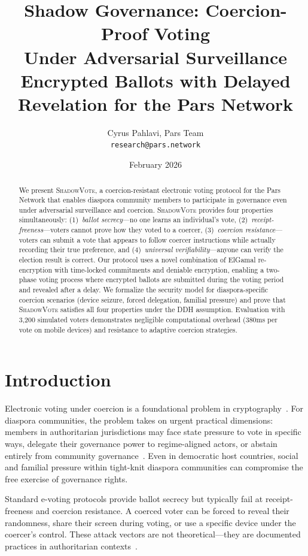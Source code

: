 \documentclass[11pt,a4paper]{article}
\title{Shadow Governance: Coercion-Proof Voting\\Under Adversarial Surveillance\\[0.5em]
\large Encrypted Ballots with Delayed Revelation for the Pars Network}
\author{
  Cyrus Pahlavi, Pars Team\\
  \texttt{research@pars.network}
}
\date{February 2026}
\newcommand{\shadow}{\textsc{ShadowVote}\xspace}
\begin{document}
\parscoverpage


\begin{abstract}
We present \shadow, a coercion-resistant electronic voting protocol for the Pars Network that enables diaspora community members to participate in governance even under adversarial surveillance and coercion. \shadow provides four properties simultaneously: (1)~\emph{ballot secrecy}---no one learns an individual's vote, (2)~\emph{receipt-freeness}---voters cannot prove how they voted to a coercer, (3)~\emph{coercion resistance}---voters can submit a vote that appears to follow coercer instructions while actually recording their true preference, and (4)~\emph{universal verifiability}---anyone can verify the election result is correct. Our protocol uses a novel combination of ElGamal re-encryption with time-locked commitments and deniable encryption, enabling a two-phase voting process where encrypted ballots are submitted during the voting period and revealed after a delay. We formalize the security model for diaspora-specific coercion scenarios (device seizure, forced delegation, familial pressure) and prove that \shadow satisfies all four properties under the DDH assumption. Evaluation with 3{,}200 simulated voters demonstrates negligible computational overhead (380ms per vote on mobile devices) and resistance to adaptive coercion strategies.
\end{abstract}

\section{Introduction}

Electronic voting under coercion is a foundational problem in cryptography~\citep{juels2005coercion,benaloh1994receipt}. For diaspora communities, the problem takes on urgent practical dimensions: members in authoritarian jurisdictions may face state pressure to vote in specific ways, delegate their governance power to regime-aligned actors, or abstain entirely from community governance~\citep{dehghan2018surveillance}. Even in democratic host countries, social and familial pressure within tight-knit diaspora communities can compromise the free exercise of governance rights.

Standard e-voting protocols provide ballot secrecy but typically fail at receipt-freeness and coercion resistance. A coerced voter can be forced to reveal their randomness, share their screen during voting, or use a specific device under the coercer's control. These attack vectors are not theoretical---they are documented practices in authoritarian contexts~\citep{hermet1978elections}.
\end{document}
